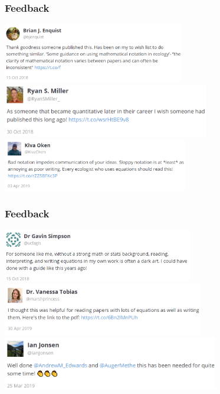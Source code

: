 
\begin{frame}
\frametitle{Feedback}

\centering
\includegraphics[height=2.6cm]{images/twitter-enquist.png}
\includegraphics[height=2.3cm]{images/twitter-miller.png}
\includegraphics[height=2.3cm]{images/twitter-oken.png}

\end{frame}


\begin{frame}
\frametitle{Feedback}

\centering
\includegraphics[height=2.3cm]{images/twitter-simpson.png}
\includegraphics[height=2.3cm]{images/twitter-tobias.png}
\includegraphics[height=2.3cm]{images/twitter-jonsen.png}

\end{frame}



